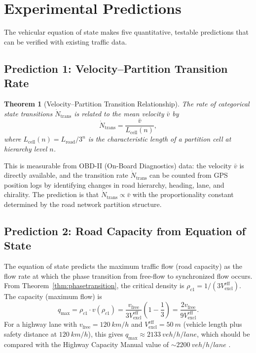\documentclass[twocolumn,10pt]{article}
\newtheorem{theorem}{Theorem}[section]
\newcommand{\Vexcl}{V_{\mathrm{excl}}}
\begin{document}
\section{Experimental Predictions}\label{sec:predictions}

The vehicular equation of state makes five quantitative, testable predictions that can be verified with existing traffic data.

\subsection{Prediction 1: Velocity--Partition Transition Rate}

\begin{theorem}[Velocity--Partition Transition Relationship]\label{thm:pred1}
The rate of categorical state transitions $\dot{N}_{\mathrm{trans}}$ is related to the mean velocity $\bar{v}$ by
\begin{equation}\label{eq:pred1}
\dot{N}_{\mathrm{trans}} = \frac{\bar{v}}{L_{\mathrm{cell}}(n)},
\end{equation}
where $L_{\mathrm{cell}}(n) = L_{\mathrm{road}} / 3^n$ is the characteristic length of a partition cell at hierarchy level $n$.
\end{theorem}

This is measurable from OBD-II (On-Board Diagnostics) data: the velocity $\bar{v}$ is directly available, and the transition rate $\dot{N}_{\mathrm{trans}}$ can be counted from GPS position logs by identifying changes in road hierarchy, heading, lane, and chirality. The prediction is that $\dot{N}_{\mathrm{trans}} \propto \bar{v}$ with the proportionality constant determined by the road network partition structure.

\subsection{Prediction 2: Road Capacity from Equation of State}

The equation of state predicts the maximum traffic flow (road capacity) as the flow rate at which the phase transition from free-flow to synchronized flow occurs. From Theorem~\ref{thm:phasetransition}, the critical density is $\rho_{c1} = 1/(3\Vexcl^{\mathrm{eff}})$. The capacity (maximum flow) is
\begin{equation}\label{eq:pred2}
q_{\mathrm{max}} = \rho_{c1} \cdot v(\rho_{c1}) = \frac{v_{\mathrm{free}}}{3\Vexcl^{\mathrm{eff}}} \left(1 - \frac{1}{3}\right) = \frac{2v_{\mathrm{free}}}{9\Vexcl^{\mathrm{eff}}}.
\end{equation}
For a highway lane with $v_{\mathrm{free}} = \SI{120}{km/h}$ and $\Vexcl^{\mathrm{eff}} = \SI{50}{m}$ (vehicle length plus safety distance at $\SI{120}{km/h}$), this gives $q_{\mathrm{max}} \approx \SI{2133}{veh/h/lane}$, which should be compared with the Highway Capacity Manual value of $\sim \SI{2200}{veh/h/lane}$ \cite{greenshields1935}.
\end{document}
